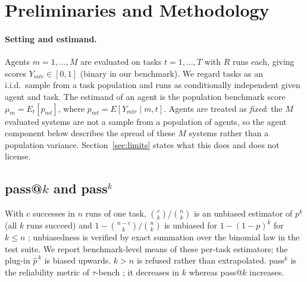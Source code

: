 \section{Preliminaries and Methodology}\label{sec:method}
\paragraph{Setting and estimand.} Agents $m=1,\dots,M$ are evaluated on tasks $t=1,\dots,T$ with $R$ runs each, giving scores $Y_{mtr}\in[0,1]$ (binary in our benchmark). We regard tasks as an i.i.d.\ sample from a task population and runs as conditionally independent given agent and task. The estimand of an agent is the population benchmark score $\mu_m=E_t[p_{mt}]$, where $p_{mt}=E[Y_{mtr}\mid m,t]$. Agents are treated as \emph{fixed}: the $M$ evaluated systems are not a sample from a population of agents, so the agent component below describes the spread of these $M$ systems rather than a population variance. Section~\ref{sec:limits} states what this does and does not license.

\subsection{pass@$k$ and pass$^k$}
With $c$ successes in $n$ runs of one task, $\binom{c}{k}/\binom{n}{k}$ is an unbiased estimator of $p^k$ (all $k$ runs succeed) and $1-\binom{n-c}{k}/\binom{n}{k}$ is unbiased for $1-(1-p)^k$ for $k\le n$ \citep{chen2021codex}; unbiasedness is verified by exact summation over the binomial law in the test suite. We report benchmark-level means of these per-task estimators; the plug-in $\hat p^{\,k}$ is biased upwards. $k>n$ is refused rather than extrapolated. pass$^k$ is the reliability metric of $\tau$-bench \citep{yao2024taubench}; it decreases in $k$ whereas pass@$k$ increases.

